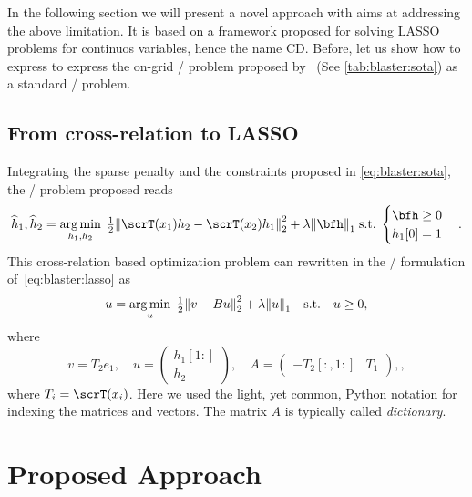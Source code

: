 \mynewline
In the following section we will present a novel approach with aims at addressing the above limitation.
It is based on a framework proposed for solving \ac{LASSO} problems for continuos variables, hence the name \ac{CD}.
Before, let us show how to express to express the on-grid \BCE/ problem proposed by~ (See \cref{tab:blaster:sota}) as a standard \LASSO/ problem.

\subsection{From cross-relation to LASSO}
Integrating the sparse penalty and the constraints proposed in \cref{eq:blaster:sota},
the \BSNdef/ problem proposed reads
\begin{equation}\label{eq:blaster:bsn}
    \disFilterHat_1, \disFilterHat_2
    =
    \kargmin_{\disFilter_1, \disFilter_2}
    \;
    \tfrac{1}{2}
    \kvvbar{
        \scrT(\disRecordedSignal_1) \disFilter_2
        -
        \scrT(\disRecordedSignal_2) \disFilter_1
    }_2^2
    + \lambda\kvvbar{\bfh}_1
    \;\text{s.t.}\;
    \begin{cases}
        \bfh \geq 0\\
        h_1[0] = 1
    \end{cases}
    .
\end{equation}
This cross-relation based optimization problem can rewritten in the \LASSO/ formulation of~\cref{eq:blaster:lasso} as
\begin{equation*}
    u
    =
    \kargmin_{u}
    \;
    \tfrac{1}{2}
    \kvvbar{ v - B u }_2^2
    + \lambda\kvvbar{u}_1
    \quad\text{s.t.}\quad
    u \geq 0
    ,
\end{equation*}
where
\begin{equation*}
    v = T_2e_1,
    \quad
    u =
    \begin{pmatrix}
        h_1[1:] \\
        h_2
    \end{pmatrix},
    \quad
    A =
    \begin{pmatrix}
        -T_2[:, 1:] & T_1
    \end{pmatrix},
    ,
\end{equation*}
where $T_i = \scrT(x_i)$.
Here we used the light, yet common, Python notation for indexing the matrices and vectors.
The matrix $A$ is typically called \textit{dictionary}.


\section{Proposed Approach}

